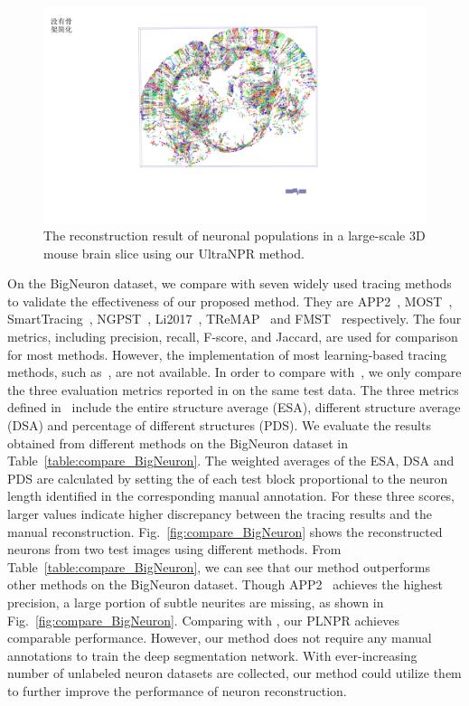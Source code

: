 \begin{figure}[t]
	\centering
	\includegraphics[width=1\columnwidth]{./Illustrations/brain_slice.pdf}
	\caption{The reconstruction result of neuronal populations in a large-scale 3D mouse brain slice using our UltraNPR method.}
	\label{fig:reconstruct_brain}
\end{figure}


On the BigNeuron dataset, we compare with seven widely used tracing methods to validate the effectiveness of our proposed method.
They are APP2~\cite{Xiao2013}, MOST~\cite{Wu2014}, SmartTracing~\cite{Chen2015}, NGPST~\cite{Quan2015}, Li2017~\cite{Li2017}, TReMAP~\cite{Zhou2016} and FMST~\cite{Yang2019} respectively.
%
The four metrics, including precision, recall, F-score, and Jaccard, are used for comparison for most methods.
However, the implementation of most learning-based tracing methods, such as~\cite{Li2017}, are not available.
In order to compare with~\cite{Li2017}, we only compare the three evaluation metrics reported in \cite{Li2017} on the same test data.
%
The three metrics defined in~\cite{Peng2010a} include the entire structure average (ESA), different structure average (DSA) and percentage of different structures (PDS).  
%
We evaluate the results obtained from different methods on the BigNeuron dataset in Table~\ref{table:compare_BigNeuron}.
The weighted averages of the ESA, DSA and PDS are calculated by setting the of each test block proportional to the neuron length identified in the corresponding manual annotation.
For these three scores, larger values indicate higher discrepancy between the tracing results and the manual reconstruction.
%
Fig.~\ref{fig:compare_BigNeuron} shows the reconstructed neurons from two test images using different methods.
%
From Table~\ref{table:compare_BigNeuron}, we can see that our method outperforms other methods on the BigNeuron dataset.
Though APP2~\cite{Xiao2013} achieves the highest precision, a large portion of subtle neurites are missing, as shown in Fig.~\ref{fig:compare_BigNeuron}.
%
Comparing with \cite{Li2017}, our PLNPR achieves comparable performance.
%
However, our method does not require any manual annotations to train the deep segmentation network.
With ever-increasing number of unlabeled neuron datasets are collected, our method could utilize them to further improve the performance of neuron reconstruction.



